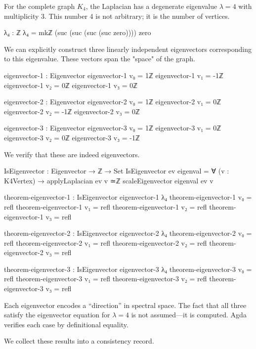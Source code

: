 \documentclass[11pt,a4paper]{book}
\begin{document}
For the complete graph $K_4$, the Laplacian has a degenerate eigenvalue $\lambda = 4$ with multiplicity 3. This number 4 is not arbitrary; it is the number of vertices.

\begin{code}
λ₄ : ℤ
λ₄ = mkℤ (suc (suc (suc (suc zero)))) zero

\end{code}

We can explicitly construct three linearly independent eigenvectors corresponding to this eigenvalue. These vectors span the "space" of the graph.

\begin{code}
eigenvector-1 : Eigenvector
eigenvector-1 v₀ = 1ℤ
eigenvector-1 v₁ = -1ℤ
eigenvector-1 v₂ = 0ℤ
eigenvector-1 v₃ = 0ℤ

eigenvector-2 : Eigenvector
eigenvector-2 v₀ = 1ℤ
eigenvector-2 v₁ = 0ℤ
eigenvector-2 v₂ = -1ℤ
eigenvector-2 v₃ = 0ℤ

eigenvector-3 : Eigenvector
eigenvector-3 v₀ = 1ℤ
eigenvector-3 v₁ = 0ℤ
eigenvector-3 v₂ = 0ℤ
eigenvector-3 v₃ = -1ℤ
\end{code}

We verify that these are indeed eigenvectors.

\begin{code}
IsEigenvector : Eigenvector → ℤ → Set
IsEigenvector ev eigenval = ∀ (v : K4Vertex) → 
  applyLaplacian ev v ≃ℤ scaleEigenvector eigenval ev v

theorem-eigenvector-1 : IsEigenvector eigenvector-1 λ₄
theorem-eigenvector-1 v₀ = refl
theorem-eigenvector-1 v₁ = refl
theorem-eigenvector-1 v₂ = refl
theorem-eigenvector-1 v₃ = refl

theorem-eigenvector-2 : IsEigenvector eigenvector-2 λ₄
theorem-eigenvector-2 v₀ = refl
theorem-eigenvector-2 v₁ = refl
theorem-eigenvector-2 v₂ = refl
theorem-eigenvector-2 v₃ = refl

theorem-eigenvector-3 : IsEigenvector eigenvector-3 λ₄
theorem-eigenvector-3 v₀ = refl
theorem-eigenvector-3 v₁ = refl
theorem-eigenvector-3 v₂ = refl
theorem-eigenvector-3 v₃ = refl
\end{code}

Each eigenvector encodes a ``direction'' in spectral space. The fact that all three satisfy the eigenvector equation for $\lambda = 4$ is not assumed---it is computed. Agda verifies each case by definitional equality.

We collect these results into a consistency record.
\end{document}

